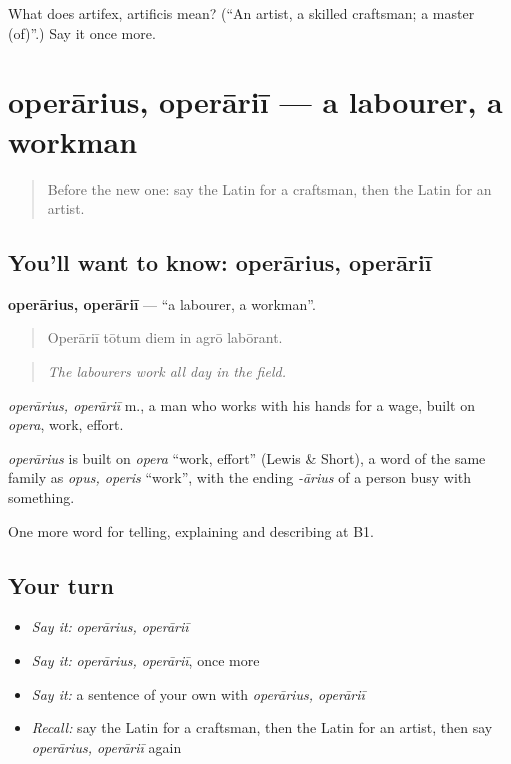 \begin{tcolorbox}[breakable,colback=teal!4,colframe=teal!35!black,title={Before you move on}]
What does artifex, artificis mean? (\textquotedblleft{}An artist, a skilled craftsman; a master (of)\textquotedblright{}.) Say it once more.
\end{tcolorbox}
\section[operārius, operāriī]{operārius, operāriī — a labourer, a workman}

\label{lesson:LA-C376-operarius}



\begin{quote}
Before the new one: say the Latin for a craftsman, then the Latin for an artist.
\end{quote}

\subsection*{You'll want to know: operārius, operāriī}
\textbf{operārius, operāriī} — \textquotedblleft{}a labourer, a workman\textquotedblright{}.

\begin{quote}
Operāriī tōtum diem in agrō labōrant.
\end{quote}

\begin{quote}
\emph{The labourers work all day in the field.}
\end{quote}

\emph{operārius, operāriī} m., a man who works with his hands for a wage, built on \emph{opera}, work, effort.

\begin{cousinweb}
\emph{operārius} is built on \emph{opera} \textquotedblleft{}work, effort\textquotedblright{} (Lewis \& Short), a word of the same family as \emph{opus, operis} \textquotedblleft{}work\textquotedblright{}, with the ending \emph{-ārius} of a person busy with something.
\end{cousinweb}

\begin{grammarlens}[title={What you've built}]
One more word for telling, explaining and describing at B1.
\end{grammarlens}

\subsection*{Your turn}
\begin{itemize}
\raggedright
  \item \emph{Say it:} \emph{operārius, operāriī}
  \item \emph{Say it:} \emph{operārius, operāriī}, once more
  \item \emph{Say it:} a sentence of your own with \emph{operārius, operāriī}
  \item \emph{Recall:} say the Latin for a craftsman, then the Latin for an artist, then say \emph{operārius, operāriī} again
\end{itemize}

